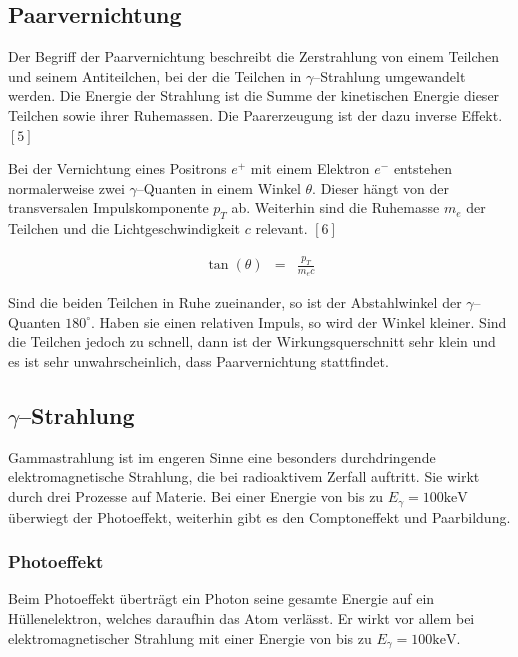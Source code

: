 \documentclass[12pt,a4paper]{scrartcl}
\numberwithin{equation}{section} %
\newcommand{\pu}[1]{\ensuremath{\mathrm{#1}}}
\renewcommand{\[}{} %
\renewcommand{\]}{\noindent} %
\begin{document}
\hypertarget{paarvernichtung}{%
\subsection{Paarvernichtung}\label{paarvernichtung}}

Der Begriff der Paarvernichtung beschreibt die Zerstrahlung von einem
Teilchen und seinem Antiteilchen, bei der die Teilchen in
\(\gamma\)--Strahlung umgewandelt werden. Die Energie der Strahlung ist
die Summe der kinetischen Energie dieser Teilchen sowie ihrer
Ruhemassen. Die Paarerzeugung ist der dazu inverse Effekt. \([5]\)

Bei der Vernichtung eines Positrons \(e^+\) mit einem Elektron \(e^-\)
entstehen normalerweise zwei \(\gamma\)--Quanten in einem Winkel
\(\theta\). Dieser hängt von der transversalen Impulskomponente \(p_T\)
ab. Weiterhin sind die Ruhemasse \(m_e\) der Teilchen und die
Lichtgeschwindigkeit \(c\) relevant. \([6]\)

\[
\begin{eqnarray}
    \tan(\theta) &=& \frac{p_T}{m_ec}
\end{eqnarray}
\]

Sind die beiden Teilchen in Ruhe zueinander, so ist der Abstahlwinkel
der \(\gamma\)--Quanten \(\pu{180^\circ}\). Haben sie einen relativen
Impuls, so wird der Winkel kleiner. Sind die Teilchen jedoch zu schnell,
dann ist der Wirkungsquerschnitt sehr klein und es ist sehr
unwahrscheinlich, dass Paarvernichtung stattfindet.

\hypertarget{gammastrahlung}{%
\subsection{\texorpdfstring{\(\gamma\)--Strahlung}{\textbackslash gamma--Strahlung}}\label{gammastrahlung}}

Gammastrahlung ist im engeren Sinne eine besonders durchdringende
elektromagnetische Strahlung, die bei radioaktivem Zerfall auftritt. Sie
wirkt durch drei Prozesse auf Materie. Bei einer Energie von bis zu
\(E_\gamma = \pu{100 keV}\) überwiegt der Photoeffekt, weiterhin gibt es
den Comptoneffekt und Paarbildung.

\hypertarget{photoeffekt}{%
\subsubsection{Photoeffekt}\label{photoeffekt}}

Beim Photoeffekt überträgt ein Photon seine gesamte Energie auf ein
Hüllenelektron, welches daraufhin das Atom verlässt. Er wirkt vor allem
bei elektromagnetischer Strahlung mit einer Energie von bis zu
\(E_\gamma = \pu{100 keV}\).
\end{document}

